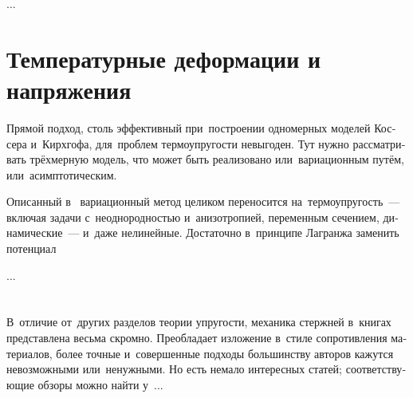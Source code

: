 \begin{otherlanguage}{russian}
...



\section{Температурные деформации и напряжения}

Прямой подход, столь эффективный при~построении одномерных моделей Коссера и~Кирхгофа, для~проблем термоупругости невыгоден. Тут нужно рассматривать трёхмерную модель, что может быть реализовано или~вариационным путём, или~асимптотическим.

Описанный в~ вариационный метод целиком переносится на~термоупругость~--- включая задачи с~неоднородностью и~анизотропией, переменным сечением, динамические~--- и~даже нелинейные. Достаточно в~принципе Лагранжа заменить потенциал

...




\vspace{8mm}
\hfill\begin{minipage}[b]{0.95\linewidth}
\fontsize{10}{12}\selectfont

\section*{\wordforbibliography}

В~отличие от~других разделов теории упругости, механика стержней в~книгах представлена весьма скромно. Преобладает изложение в~стиле сопротивления материалов, более точные и~совершенные подходы большинству авторов кажутся невозможными или~ненужными. Но есть немало интересных статей; соответствующие обзоры можно найти у~...

\end{minipage}

\end{otherlanguage}
